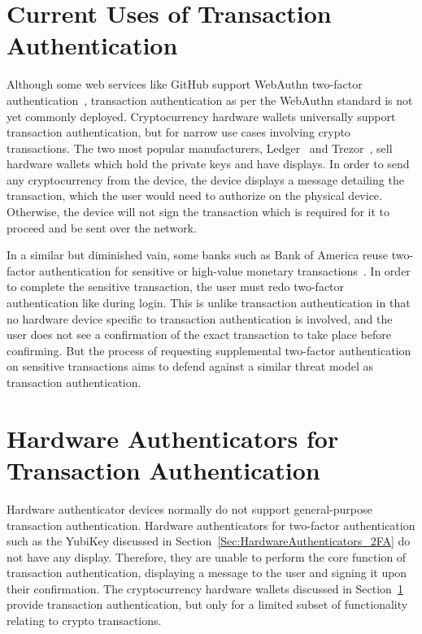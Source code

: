 \section{Current Uses of Transaction Authentication}\label{Sec:CurrentUses_txAuthn}


Although some web services like GitHub support WebAuthn two-factor authentication~\cite{webauthn-in-github}, transaction authentication as per the WebAuthn standard is not yet commonly deployed. Cryptocurrency hardware wallets universally support transaction authentication, but for narrow use cases involving crypto transactions. The two most popular manufacturers, Ledger~\cite{ledger} and Trezor~\cite{trezor}, sell hardware wallets which hold the private keys and have displays. In order to send any cryptocurrency from the device, the device displays a message detailing the transaction, which the user would need to authorize on the physical device. Otherwise, the device will not sign the transaction which is required for it to proceed and be sent over the network.

In a similar but diminished vain, some banks such as Bank of America reuse two-factor authentication for sensitive or high-value monetary transactions~\cite{BoA-2FA}. In order to complete the sensitive transaction, the user must redo two-factor authentication like during login. This is unlike transaction authentication in that no hardware device specific to transaction authentication is involved, and the user does not see a confirmation of the exact transaction to take place before confirming. But the process of requesting supplemental two-factor authentication on sensitive transactions aims to defend against a similar threat model as transaction authentication.

\section{Hardware Authenticators for \newline Transaction Authentication}

Hardware authenticator devices normally do not support general-purpose transaction authentication. Hardware authenticators for two-factor authentication such as the YubiKey discussed in Section~\ref{Sec:HardwareAuthenticators_2FA} do not have any display. Therefore, they are unable to perform the core function of transaction authentication, displaying a message to the user and signing it upon their confirmation. The cryptocurrency hardware wallets discussed in Section~\ref{Sec:CurrentUses_txAuthn} provide transaction authentication, but only for a limited subset of functionality relating to crypto transactions.  

